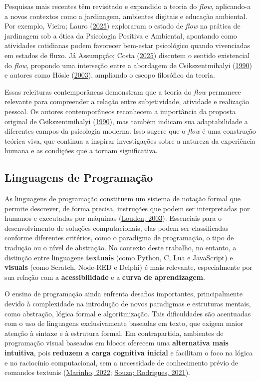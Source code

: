 \documentclass[
  12pt,
  a4paper,
]{article}
\begin{document}
Pesquisas mais recentes têm revisitado e expandido a teoria do
\emph{flow}, aplicando-a a novos contextos como a jardinagem, ambientes
digitais e educação ambiental. Por exemplo, Vieira; Lauro
(\protect\hyperlink{ref-vieira2025}{2025}) exploraram o estado de
\emph{flow} na prática de jardinagem sob a ótica da Psicologia Positiva
e Ambiental, apontando como atividades cotidianas podem favorecer
bem-estar psicológico quando vivenciadas em estados de fluxo. Já
Assumpção; Costa (\protect\hyperlink{ref-assumpcao2025}{2025}) discutem
o sentido existencial do \emph{flow}, propondo uma interseção entre a
abordagem de Csikszentmihalyi
(\protect\hyperlink{ref-csikszentmihalyi1990}{1990}) e autores como
Hösle (\protect\hyperlink{ref-hosle2003}{2003}), ampliando o escopo
filosófico da teoria.

Essas releituras contemporâneas demonstram que a teoria do \emph{flow}
permanece relevante para compreender a relação entre subjetividade,
atividade e realização pessoal. Os autores contemporâneos reconhecem a
importância da proposta original de Csikszentmihalyi
(\protect\hyperlink{ref-csikszentmihalyi1990}{1990}), mas também indicam
sua adaptabilidade a diferentes campos da psicologia moderna. Isso
sugere que o \emph{flow} é uma construção teórica viva, que continua a
inspirar investigações sobre a natureza da experiência humana e as
condições que a tornam significativa.

\hypertarget{linguagens-de-programauxe7uxe3o}{%
\subsection{Linguagens de
Programação}\label{linguagens-de-programauxe7uxe3o}}

As linguagens de programação constituem um sistema de notação formal que
permite descrever, de forma precisa, instruções que podem ser
interpretadas por humanos e executadas por máquinas
(\protect\hyperlink{ref-louden2003}{Louden, 2003}). Essenciais para o
desenvolvimento de soluções computacionais, elas podem ser classificadas
conforme diferentes critérios, como o paradigma de programação, o tipo
de tradução ou o nível de abstração. No contexto deste trabalho, no
entanto, a distinção entre linguagens \textbf{textuais} (como Python, C,
Lua e JavaScript) e \textbf{visuais} (como Scratch, Node-RED e Delphi) é
mais relevante, especialmente por sua relação com a
\textbf{acessibilidade} e a \textbf{curva de aprendizagem}.

O ensino de programação ainda enfrenta desafios importantes,
principalmente devido à complexidade na introdução de novos paradigmas e
estruturas mentais, como abstração, lógica formal e algoritmização. Tais
dificuldades são acentuadas com o uso de linguagens exclusivamente
baseadas em texto, que exigem maior atenção à sintaxe e à estrutura
formal. Em contrapartida, ambientes de programação visual baseados em
blocos oferecem uma \textbf{alternativa mais intuitiva}, pois
\textbf{reduzem a carga cognitiva inicial} e facilitam o foco na lógica
e no raciocínio computacional, sem a necessidade de conhecimento prévio
de comandos textuais (\protect\hyperlink{ref-marinho2022}{Marinho,
2022}; \protect\hyperlink{ref-souza2021}{Souza; Rodrigues, 2021}).
\end{document}
